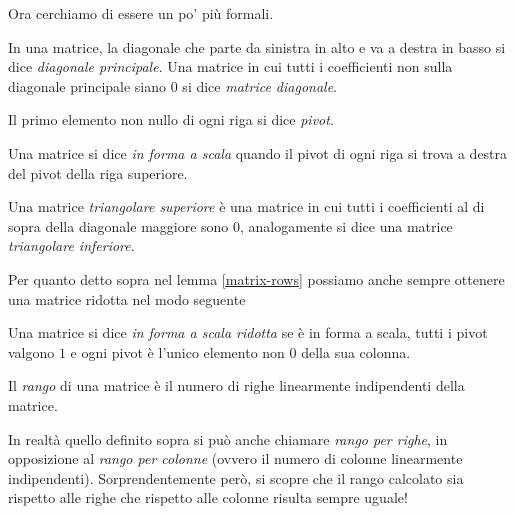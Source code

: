 \documentclass[11pt]{scrartcl}
\begin{document}
 	Ora cerchiamo di essere un po' più formali.
 	\begin{definition}
 		In una matrice, la diagonale che parte da sinistra in alto e va a destra in basso si dice \textit{diagonale principale}. Una matrice in cui tutti i coefficienti non sulla diagonale principale siano $0$ si dice \textit{matrice diagonale}.
 	\end{definition}
 	 	\begin{definition}[Pivot]
 		Il primo elemento non nullo di ogni riga si dice \textit{pivot}.
 	\end{definition}
 	\begin{definition}
 		Una matrice si dice \textit{in forma a scala} quando il pivot di ogni riga si trova a destra del pivot della riga superiore.
 	\end{definition}
 	\begin{definition}
 		Una matrice \textit{triangolare superiore} è una matrice in cui tutti i coefficienti al di sopra della diagonale maggiore sono $0$, analogamente si dice una matrice \textit{triangolare inferiore}.
 	\end{definition}
 	Per quanto detto sopra nel lemma \ref{matrix-rows} possiamo anche sempre ottenere una matrice ridotta nel modo seguente
 	\begin{definition}
 		Una matrice si dice \textit{in forma a scala ridotta} se è in forma a scala, tutti i pivot valgono $1$ e ogni pivot è l'unico elemento non $0$ della sua colonna.
 	\end{definition}
 	\begin{definition}
 		Il \textit{rango} di una matrice è il numero di righe linearmente indipendenti della matrice.
 	\end{definition}
 	In realtà quello definito sopra si può anche chiamare \textit{rango per righe}, in opposizione al \textit{rango per colonne} (ovvero il numero di colonne linearmente indipendenti). Sorprendentemente però, si scopre che il rango calcolato sia rispetto alle righe che rispetto alle colonne risulta sempre uguale!
\end{document}
